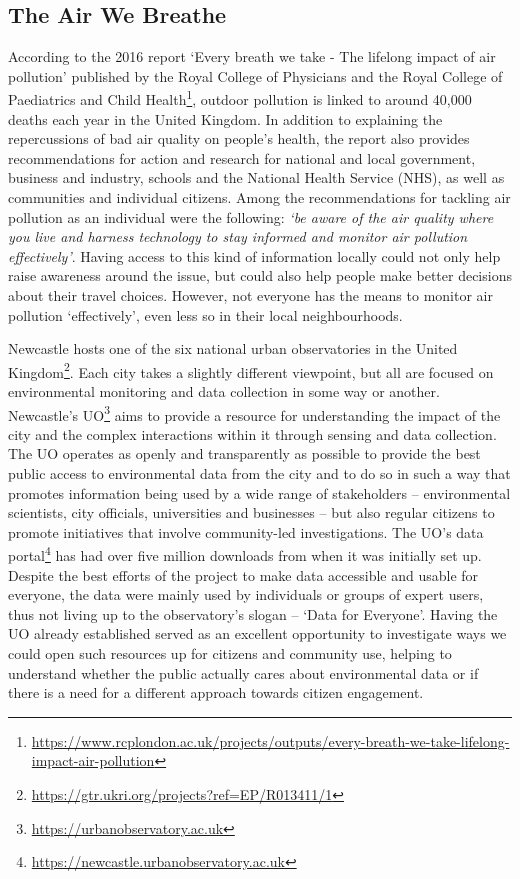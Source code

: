\subsection{The Air We Breathe}
\label{sub:breathe}
According to the 2016 report `Every breath we take - The lifelong impact of air pollution' published by the Royal College of Physicians and the Royal College of Paediatrics and Child Health\footnote{\url{https://www.rcplondon.ac.uk/projects/outputs/every-breath-we-take-lifelong-impact-air-pollution}}, outdoor pollution is linked to around 40,000 deaths each year in the United Kingdom. In addition to explaining the repercussions of bad air quality on people's health, the report also provides recommendations for action and research for national and local
government, business and industry, schools and the National Health Service (NHS), as well as communities and individual citizens. Among the recommendations for tackling air pollution as an individual were the following: \textit{`be aware of the air quality where you live and harness technology to stay informed and monitor air pollution effectively'}. Having access to this kind of information locally could not only help raise awareness around the issue, but could also help people make better decisions about their travel choices. However, not everyone has the means to monitor air pollution `effectively', even less so in their local neighbourhoods.

Newcastle hosts one of the six national urban observatories in the United Kingdom\footnote{\url{https://gtr.ukri.org/projects?ref=EP/R013411/1}}. Each city takes a slightly different viewpoint, but all are focused on environmental monitoring and data collection in some way or another. Newcastle's UO\footnote{\url{https://urbanobservatory.ac.uk}} aims to provide a resource for understanding the impact of the city and the complex interactions within it through sensing and data collection. The UO operates as openly and transparently as possible to provide the best public access to environmental data from the city and to do so in such a way that promotes information being used by a wide range of stakeholders -- environmental scientists, city officials, universities and businesses -- but also regular citizens to promote initiatives that involve community-led investigations. The UO's data portal\footnote{\url{https://newcastle.urbanobservatory.ac.uk}} has had over five million downloads from when it was initially set up. Despite the best efforts of the project to make data accessible and usable for everyone, the data were mainly used by individuals or groups of expert users, thus not living up to the observatory's slogan -- `Data for Everyone'. Having the UO already established served as an excellent opportunity to investigate ways we could open such resources up for citizens and community use, helping to understand whether the public actually cares about environmental data or if there is a need for a different approach towards citizen engagement. 
\newline

